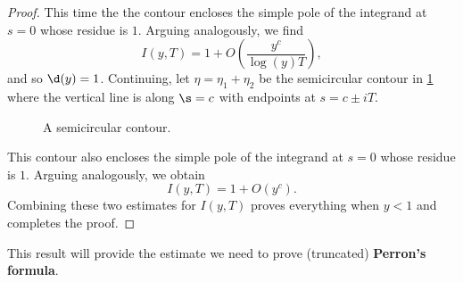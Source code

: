 \documentclass[12pt]{article}
\begin{document}
\begin{proof}
        \noindent This time the the contour encloses the simple pole of the integrand at \(s = 0\) whose residue is \(1\). Arguing analogously, we find
        \[
          I(y,T) = 1+O\left(\frac{y^{c}}{\log(y)T}\right),
        \]
        and so \(\d(y) = 1\). Continuing, let \(\eta = \eta_{1}+\eta_{2}\) be the semicircular contour in \cref{fig:discontinuous_integral_contour_4} where the vertical line is along \(\s = c\) with endpoints at \(s = c\pm iT\).
        
        \begin{figure}[h]
          \centering
          \caption{A semicircular contour.}
          \label{fig:discontinuous_integral_contour_4}
        \end{figure}
        
        \noindent This contour also encloses the simple pole of the integrand at \(s = 0\) whose residue is \(1\). Arguing analogously, we obtain
        \[
          I(y,T) = 1+O(y^{c}).
        \]
        Combining these two estimates for \(I(y,T)\) proves everything when \(y < 1\) and completes the proof.
      \end{proof}

      This result will provide the estimate we need to prove (truncated) \textbf{Perron's formula}.
\end{document}
